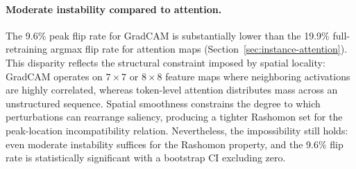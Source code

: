 

\paragraph{Moderate instability compared to attention.}
The 9.6\% peak flip rate for GradCAM is substantially lower than the 19.9\%
full-retraining argmax flip rate for attention maps (Section~\ref{sec:instance-attention}).
This disparity reflects the structural constraint imposed by spatial
locality: GradCAM operates on $7 \times 7$ or $8 \times 8$ feature maps
where neighboring activations are highly correlated, whereas token-level
attention distributes mass across an unstructured sequence.  Spatial
smoothness constrains the degree to which perturbations can rearrange
saliency, producing a tighter Rashomon set for the peak-location
incompatibility relation.  Nevertheless, the impossibility still holds:
even moderate instability suffices for the Rashomon property, and the 9.6\%
flip rate is statistically significant with a bootstrap CI excluding zero.
